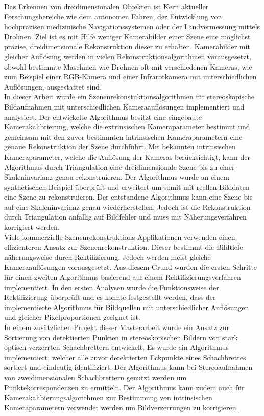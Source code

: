 
Das Erkennen von dreidimensionalen Objekten ist Kern aktueller Forschungsbereiche wie dem autonomen Fahren, der Entwicklung von hochpräzisen medizinische Navigationssystemen oder der Landvermessung mittels Drohnen. Ziel ist es mit Hilfe weniger Kamerabilder einer Szene eine möglichst präzise, dreidimensionale Rekonstruktion dieser zu erhalten. Kamerabilder mit gleicher Auflösung werden in vielen Rekonstruktionsalgorithmen vorausgesetzt, obwohl bestimmte Maschinen wie Drohnen oft mit verschiedenen Kameras, wie zum Beispiel einer RGB-Kamera und einer Infrarotkamera mit unterschiedlichen Auflösungen, ausgestattet sind.   \\

In dieser Arbeit wurde ein Szenenrekonstuktionsalgorithmen für stereoskopische Bildaufnahmen mit unterschiedlichen Kameraauflösungen implementiert und analysiert. Der entwickelte Algorithmus besitzt eine eingebaute Kamerakalibrierung, welche die extrinsischen Kameraparameter bestimmt und gemeinsam mit den zuvor bestimmten intrinsischen Kameraparametern eine genaue Rekonstruktion der Szene durchführt. Mit bekannten intrinsischen Kameraparameter, welche die Auflösung der Kameras berücksichtigt, kann der Algorithmus durch Triangulation eine dreidimensionale Szene bis zu einer Skaleninvarianz genau rekonstruieren. Der Algorithmus wurde an einem synthetischen Beispiel überprüft und erweitert um somit mit reellen Bilddaten eine Szene zu rekonstruieren. Der entstandene Algorithmus kann eine Szene bis auf eine Skaleninvarianz genau wiederherstellen. Jedoch ist die Rekonstruktion durch Triangulation anfällig auf Bildfehler und muss mit Näherungsverfahren korrigiert werden.\\

Viele kommerzielle Szenenrekonstruktions-Applikationen verwenden einen effizienteren Ansatz zur Szenenrekonstruktion. Dieser bestimmt die Bildtiefe näherungsweise durch Rektifizierung. Jedoch werden meist gleiche Kameraauflösungen vorausgesetzt. Aus diesem Grund wurden die ersten Schritte für einen zweiten Algorithmus basierend auf einem Rektifizierungsverfahren implementiert. In den ersten Analysen wurde die Funktionsweise der Rektifizierung überprüft und es konnte festgestellt werden, dass der implementierte Algorithmus für Bildquellen mit unterschiedlicher Auflösungen und gleicher Pixelproportionen geeignet ist.\\

In einem zusätzlichen Projekt dieser Masterarbeit wurde ein Ansatz zur Sortierung von detektierten Punkten in stereoskopischen Bildern von stark optisch verzerrten Schachbrettern entwickelt. Es wurde ein Algorithmus implementiert, welcher alle zuvor detektierten Eckpunkte eines Schachbrettes sortiert und eindeutig identifiziert. Der Algorithmus kann bei Stereoaufnahmen von zweidimensionalen Schachbrettern genutzt werden um Punktekorrespondenzen zu ermitteln. Der Algorithmus kann zudem auch für  Kamerakalibierungsalgorithmen zur Bestimmung von intrinsischen Kameraparametern verwendet werden um Bildverzerrungen zu korrigieren.  


